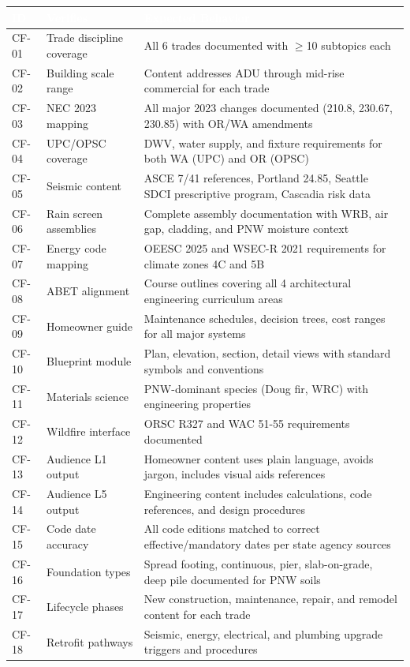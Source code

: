 \documentclass[11pt,letterpaper]{article}
\newcommand{\tableheader}[1]{\textbf{\sffamily\textcolor{white}{#1}}}
\begin{document}
\begin{center}
\begin{tabularx}{\textwidth}{C{1.2cm}L{3.5cm}X}
\toprule
{}
\tableheader{ID} & \tableheader{Verifies} & \tableheader{Expected Behavior} \\
\midrule
CF-01 & Trade discipline coverage & All 6 trades documented with $\geq$10 subtopics each \\
CF-02 & Building scale range & Content addresses ADU through mid-rise commercial for each trade \\
CF-03 & NEC 2023 mapping & All major 2023 changes documented (210.8, 230.67, 230.85) with OR/WA amendments \\
CF-04 & UPC/OPSC coverage & DWV, water supply, and fixture requirements for both WA (UPC) and OR (OPSC) \\
CF-05 & Seismic content & ASCE 7/41 references, Portland 24.85, Seattle SDCI prescriptive program, Cascadia risk data \\
CF-06 & Rain screen assemblies & Complete assembly documentation with WRB, air gap, cladding, and PNW moisture context \\
CF-07 & Energy code mapping & OEESC 2025 and WSEC-R 2021 requirements for climate zones 4C and 5B \\
CF-08 & ABET alignment & Course outlines covering all 4 architectural engineering curriculum areas \\
CF-09 & Homeowner guide & Maintenance schedules, decision trees, cost ranges for all major systems \\
CF-10 & Blueprint module & Plan, elevation, section, detail views with standard symbols and conventions \\
CF-11 & Materials science & PNW-dominant species (Doug fir, WRC) with engineering properties \\
CF-12 & Wildfire interface & ORSC R327 and WAC 51-55 requirements documented \\
CF-13 & Audience L1 output & Homeowner content uses plain language, avoids jargon, includes visual aids references \\
CF-14 & Audience L5 output & Engineering content includes calculations, code references, and design procedures \\
CF-15 & Code date accuracy & All code editions matched to correct effective/mandatory dates per state agency sources \\
CF-16 & Foundation types & Spread footing, continuous, pier, slab-on-grade, deep pile documented for PNW soils \\
CF-17 & Lifecycle phases & New construction, maintenance, repair, and remodel content for each trade \\
CF-18 & Retrofit pathways & Seismic, energy, electrical, and plumbing upgrade triggers and procedures \\
\bottomrule
\end{tabularx}
\end{center}
\end{document}
